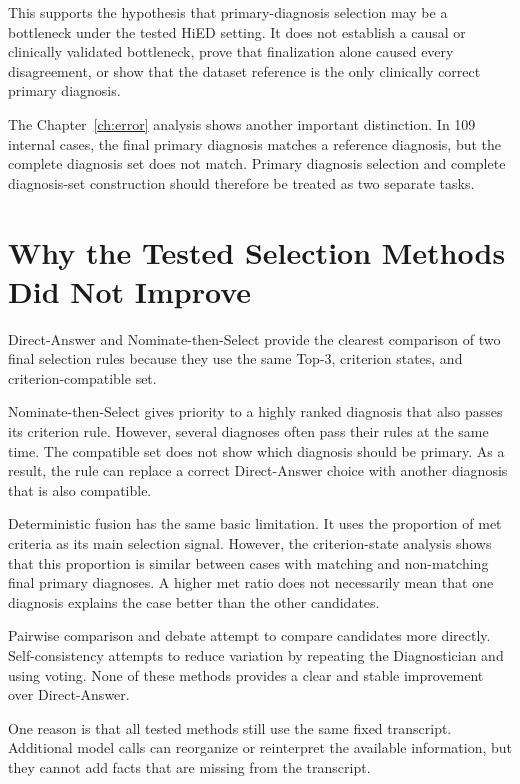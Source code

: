 \documentclass[12pt,a4paper,oneside]{report}
\begin{document}
This supports the hypothesis that primary-diagnosis selection may be a
bottleneck under the tested HiED setting. It does not establish a causal
or clinically validated bottleneck, prove that finalization alone caused
every disagreement, or show that the dataset reference is the only
clinically correct primary diagnosis.

The Chapter~\ref{ch:error} analysis shows another important distinction.
In 109 internal cases, the final primary diagnosis matches a reference
diagnosis, but the complete diagnosis set does not match. Primary
diagnosis selection and complete diagnosis-set construction should
therefore be treated as two separate tasks.

\section{Why the Tested Selection Methods Did Not Improve}
\label{sec:discussion-selection-strategies}

Direct-Answer and Nominate-then-Select provide the clearest comparison
of two final selection rules because they use the same Top-3, criterion
states, and criterion-compatible set.

Nominate-then-Select gives priority to a highly ranked diagnosis that
also passes its criterion rule. However, several diagnoses often pass
their rules at the same time. The compatible set does not show which
diagnosis should be primary. As a result, the rule can replace a correct
Direct-Answer choice with another diagnosis that is also compatible.

Deterministic fusion has the same basic limitation. It uses the
proportion of met criteria as its main selection signal. However, the
criterion-state analysis shows that this proportion is similar between
cases with matching and non-matching final primary diagnoses. A higher
met ratio does not necessarily mean that one diagnosis explains the case
better than the other candidates.

Pairwise comparison and debate attempt to compare candidates more
directly. Self-consistency attempts to reduce variation by repeating the
Diagnostician and using voting. None of these methods provides a clear
and stable improvement over Direct-Answer.

One reason is that all tested methods still use the same fixed
transcript. Additional model calls can reorganize or reinterpret the
available information, but they cannot add facts that are missing from
the transcript.
\end{document}
